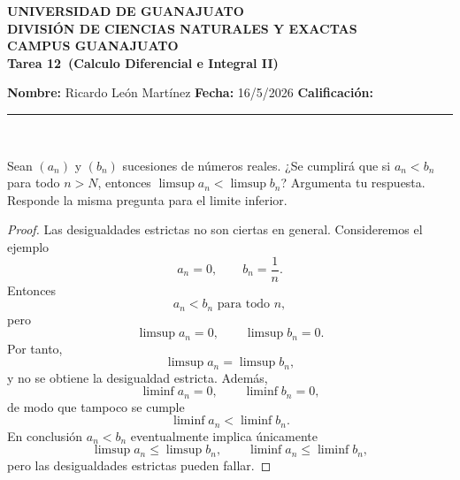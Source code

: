 \documentclass[12pt,a4paper]{article}
\newcommand{\alumno}{Ricardo León Martínez}
\newcommand{\materia}{Calculo Diferencial e Integral II}
\newcommand{\tarea}{Tarea 12}
\newcommand{\fecha}{16/5/2026}
\begin{document}
    \begin{center}
    {\large\textbf{UNIVERSIDAD DE GUANAJUATO}}\\[0.3cm]
    {\normalsize\textbf{DIVISIÓN DE CIENCIAS NATURALES Y EXACTAS}}\\
    {\normalsize\textbf{CAMPUS GUANAJUATO}}\\[1cm]

    {\Large\textbf{\tarea\ (\materia)}}\\[1cm]
    \end{center}

    \textbf{Nombre:} \alumno \hfill 
    \textbf{Fecha:} \fecha \hfill 
    \textbf{Calificación:} \rule{3cm}{0.4pt} \\[0.3cm]

    \begin{mdframed}[style=mdpinkbox,frametitle={Ejercicio 1}]
        Sean $(a_{n})$ y $(b_{n})$ sucesiones de números reales. ¿Se cumplirá que si $a_{n}\lt b_{n}$ para todo $n\gt N$,
        entonces $\limsup a_{n}\lt\limsup b_{n}$? Argumenta tu respuesta. Responde la misma
        pregunta para el limite inferior.
    \end{mdframed}

    \begin{proof}
        Las desigualdades estrictas no son ciertas en general. Consideremos el ejemplo
        \begin{equation*}
            a_{n}=0, \qquad b_{n}=\frac{1}{n}.
        \end{equation*}
        Entonces
        \begin{equation*}
            a_{n}\lt b_{n}\text{ para todo }n,
        \end{equation*}
        pero
        \begin{equation*}
            \limsup a_{n}=0,\qquad\limsup b_{n}=0.
        \end{equation*}
        Por tanto,
        \begin{equation*}
            \limsup a_{n}=\limsup b_{n},
        \end{equation*}
        y no se obtiene la desigualdad estricta. Además,
        \begin{equation*}
            \liminf a_{n}=0,\qquad \liminf b_{n}=0,
        \end{equation*}
        de modo que tampoco se cumple
        \begin{equation*}
            \liminf a_{n}\lt\liminf b_{n}.
        \end{equation*}
        En conclusión $a_{n}\lt b_{n}$ eventualmente implica únicamente
        \begin{equation*}
            \limsup a_{n}\leq\limsup b_{n},\qquad\liminf a_{n}\leq \liminf b_{n},
        \end{equation*}
        pero las desigualdades estrictas pueden fallar.
    \end{proof}
\end{document}
